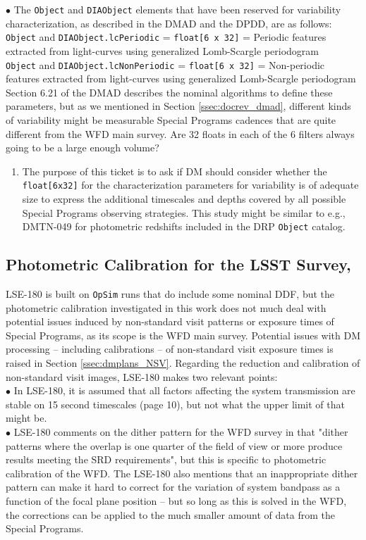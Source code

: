\documentclass[DM,lsstdraft,toc]{lsstdoc}
\begin{document}
$\bullet$ The \texttt{Object} and \texttt{DIAObject} elements that have been reserved for variability characterization, as described in the DMAD and the DPDD, are as follows: \\
\texttt{Object} and \texttt{DIAObject.lcPeriodic} = \texttt{float[6 x 32]} = Periodic features extracted from light-curves using generalized Lomb-Scargle periodogram \\
\texttt{Object} and \texttt{DIAObject.lcNonPeriodic} = \texttt{float[6 x 32]} = Non-periodic features extracted from light-curves using generalized Lomb-Scargle periodogram \\
Section 6.21 of the DMAD describes the nominal algorithms to define these parameters, but as we mentioned in Section \ref{ssec:docrev_dmad}, different kinds of variability might be measurable Special Programs cadences that are quite different from the WFD main survey. Are 32 floats in each of the 6 filters always going to be a large enough volume?
\begin{enumerate}[resume,topsep=-10pt,label= \textbf{Action \Roman*}] \item \label{DPDD-2} The purpose of this ticket is to ask if DM should consider whether the \texttt{float[6x32]} for the characterization parameters for variability is of adequate size to express the additional timescales and depths covered by all possible Special Programs observing strategies. This study might be similar to e.g., DMTN-049 for photometric redshifts included in the DRP \texttt{Object} catalog. \end{enumerate}


\subsection{Photometric Calibration for the LSST Survey, }

LSE-180 is built on \texttt{OpSim} runs that do include some nominal DDF, but the photometric calibration investigated in this work does not much deal with potential issues induced by non-standard visit patterns or exposure times of Special Programs, as its scope is the WFD main survey. Potential issues with DM processing -- including calibrations -- of non-standard visit exposure times is raised in Section \ref{ssec:dmplans_NSV}. Regarding the reduction and calibration of non-standard visit images, LSE-180 makes two relevant points: \\
$\bullet$ In LSE-180, it is assumed that all factors affecting the system transmission are stable on 15 second timescales (page 10), but not what the upper limit of that might be. \\
$\bullet$ LSE-180 comments on the dither pattern for the WFD survey in that "dither patterns where the overlap is one quarter of the field of view or more produce results meeting the SRD requirements", but this is specific to photometric calibration of the WFD. The LSE-180 also mentions that an inappropriate dither pattern can make it hard to correct for the variation of system bandpass as a function of the focal plane position -- but so long as this is solved in the WFD, the corrections can be applied to the much smaller amount of data from the Special Programs.
\end{document}
